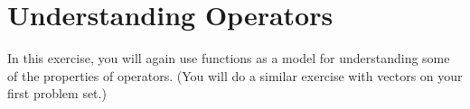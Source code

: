 %
%
%
%

\section*{Understanding Operators}

	In this exercise, you will again use functions as a model for understanding some of the properties of operators.
	(You will do a similar exercise with vectors on your first problem set.)

